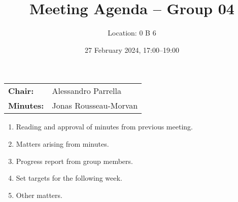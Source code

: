\documentclass{cce2014-meetings}
\title{Meeting Agenda -- Group 04}
\author{Location: 0 B 6}
\date{27 February 2024, 17:00--19:00}
\begin{document}
\maketitle
\begin{center}
        \begin{tabular}{ll}
                \textbf{Chair:}   & Alessandro Parrella   \\
                \textbf{Minutes:} & Jonas Rousseau-Morvan
        \end{tabular}
\end{center}

\begin{enumerate}

        \item Reading and approval of minutes from previous meeting.

        \item Matters arising from minutes.

        \item Progress report from group members.

        \item Set targets for the following week.

        \item Other matters.

\end{enumerate}
\end{document}
